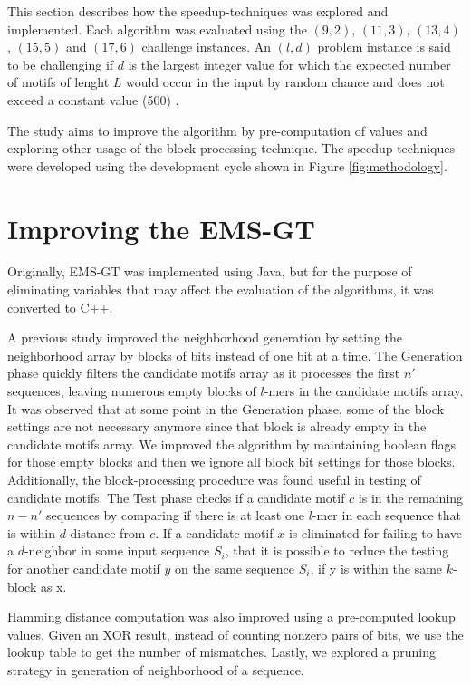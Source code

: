 This section describes how the speedup-techniques was explored and implemented. Each algorithm was evaluated using the $(9, 2)$, $(11, 3)$, $(13, 4)$, $(15, 5)$ and $(17, 6)$ challenge instances. An $(l, d)$ problem instance is said to be challenging if $d$ is the largest integer value for which the expected number of motifs of lenght $L$ would occur in the input by random chance and does not exceed a constant value (500) \cite{pms2015}.



The study aims to improve the algorithm by pre-computation of values and exploring other usage of the block-processing technique. The speedup techniques were developed using the development cycle shown in Figure \ref{fig:methodology}.

\section{Improving the EMS-GT}
Originally, EMS-GT was implemented using Java, but for the purpose of eliminating variables that may affect the evaluation of the algorithms, it was converted to C++. 

A previous study \cite{sia2015} improved the neighborhood generation by setting the neighborhood array by blocks of bits instead of one bit at a time. The Generation phase quickly filters the candidate motifs array as it processes the first $n'$ sequences, leaving numerous empty blocks of $l$-mers in the candidate motifs array. It was observed that at some point in the Generation phase, some of the block settings are not necessary anymore since that block is already empty in the candidate motifs array. We improved the algorithm by maintaining boolean flags for those empty blocks and then we ignore all block bit settings for those blocks. Additionally, the block-processing procedure was found useful in testing of candidate motifs. The Test phase checks if a candidate motif $c$ is in the remaining $n - n'$ sequences by comparing if there is at least one $l$-mer in each sequence that is within $d$-distance from $c$. If a candidate motif $x$ is eliminated for failing to have a $d$-neighbor in some input sequence $S_i$, that it is possible to reduce the testing for another candidate motif $y$ on the same sequence $S_i$, if y is within the same $k$-block as x.

Hamming distance computation was also improved using a pre-computed lookup values. Given an XOR result, instead of counting nonzero pairs of bits, we use the lookup table to get the number of mismatches. Lastly, we explored a pruning strategy in generation of neighborhood of a sequence.

